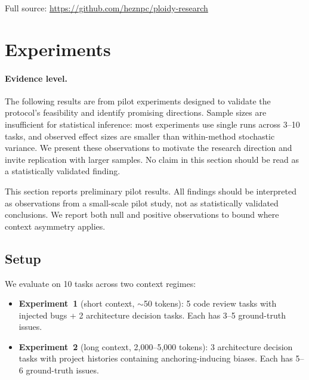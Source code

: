 \documentclass[11pt]{article}
\begin{document}
Full source: \url{https://github.com/heznpc/ploidy-research}

\section{Experiments}
\label{sec:experiments}

\paragraph{Evidence level.} The following results are from pilot experiments designed to validate the protocol's feasibility and identify promising directions. Sample sizes are insufficient for statistical inference: most experiments use single runs across 3--10 tasks, and observed effect sizes are smaller than within-method stochastic variance. We present these observations to motivate the research direction and invite replication with larger samples. No claim in this section should be read as a statistically validated finding.

This section reports preliminary pilot results. All findings should be interpreted as observations from a small-scale pilot study, not as statistically validated conclusions. We report both null and positive observations to bound where context asymmetry applies.

\subsection{Setup}
\label{sec:setup}

We evaluate on 10 tasks across two context regimes:
\begin{itemize}[leftmargin=1.5em]
  \item \textbf{Experiment~1} (short context, $\sim$50 tokens): 5 code review tasks with injected bugs + 2 architecture decision tasks. Each has 3--5 ground-truth issues.
  \item \textbf{Experiment~2} (long context, 2,000--5,000 tokens): 3 architecture decision tasks with project histories containing anchoring-inducing biases. Each has 5--6 ground-truth issues.
\end{itemize}
\end{document}
